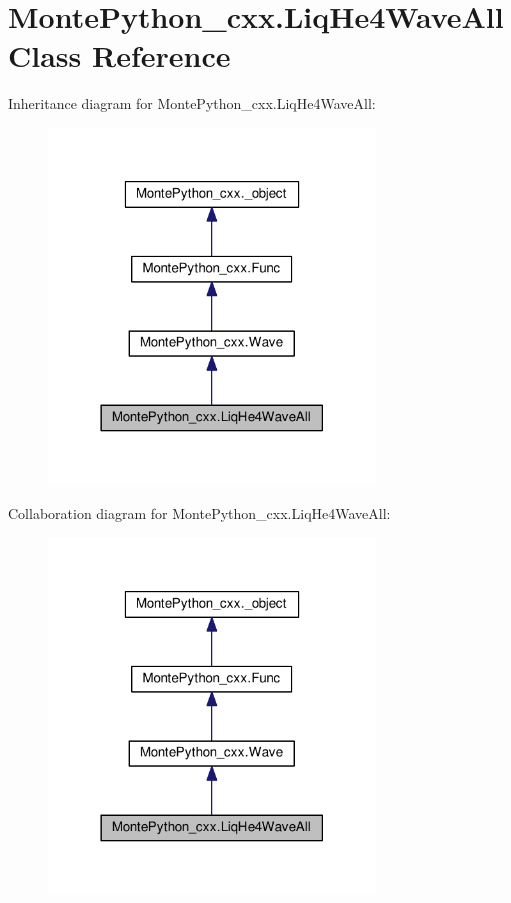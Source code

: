 \hypertarget{classMontePython__cxx_1_1LiqHe4WaveAll}{}\section{Monte\+Python\+\_\+cxx.\+Liq\+He4\+Wave\+All Class Reference}
\label{classMontePython__cxx_1_1LiqHe4WaveAll}


Inheritance diagram for Monte\+Python\+\_\+cxx.\+Liq\+He4\+Wave\+All\+:
\nopagebreak
\begin{figure}[H]
\begin{center}
\leavevmode
\includegraphics[width=246pt]{classMontePython__cxx_1_1LiqHe4WaveAll__inherit__graph}
\end{center}
\end{figure}


Collaboration diagram for Monte\+Python\+\_\+cxx.\+Liq\+He4\+Wave\+All\+:
\nopagebreak
\begin{figure}[H]
\begin{center}
\leavevmode
\includegraphics[width=246pt]{classMontePython__cxx_1_1LiqHe4WaveAll__coll__graph}
\end{center}
\end{figure}
